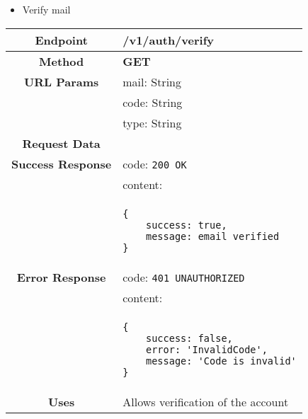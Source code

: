     \begin{itemize}
        \item Verify mail
    \end{itemize}
    \begin{adjustwidth}{1cm}{}
        \begin{longtable}{|c|l|}
            \hline
            \textbf{Endpoint} & /v1/auth/verify \\
            \hline
            \textbf{Method} & \textbf{GET} \\
            \hline
            \textbf{URL Params} & mail: String \\
            &                     code: String \\
            &                     type: String \\
            \hline
            \textbf{Request Data} & \\
            \hline
            \textbf{Success Response} & code: \texttt{200 OK} \\
            &                           content: \\
            & \begin{minipage}[t]{0.5\textwidth}
                \begin{adjustwidth}{1.5cm}{}
                \begin{verbatim}
{
    success: true, 
    message: email verified
}
                \end{verbatim}
                \end{adjustwidth}
              \end{minipage} \\
              \hline
            \textbf{Error Response} & code: \texttt{401 UNAUTHORIZED} \\
            &                         content: \\
            & \begin{minipage}[t]{0.7\textwidth}
                \begin{adjustwidth}{1.5cm}{}
                \begin{verbatim}
{
    success: false, 
    error: 'InvalidCode',
    message: 'Code is invalid'
}
                \end{verbatim}
                \end{adjustwidth}
              \end{minipage} \\
              \hline
            \textbf{Uses} & Allows verification of the account \\

\end{longtable}
\end{adjustwidth}
